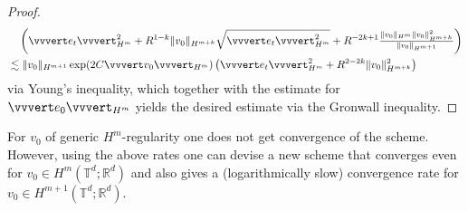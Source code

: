 \documentclass[a4paper, 12pt]{article}
\newcommand{\R}{\mathbb{R}}
\newcommand{\T}{\mathbb{T}}
\newcommand{\NHm}[1]{\vvvert#1\vvvert_{H^m}} %
\begin{document}
\begin{proof}
\begin{align*}
&\quad\left(\NHm{e_t}^2+R^{1-k}\|v_0\|_{H^{m+k}}\sqrt{\NHm{e_t}^2}+R^{-2k+1}\tfrac{\|v_0\|_{H^{m}}\|v_0\|_{H^{m+k}}^2}{\|v_0\|_{H^{m+1}}}\right)\\
&\lesssim\|v_0\|_{H^{m+1}}\exp(2C\NHm{v_0})\left(\NHm{e_t}^2+R^{2-2k}\|v_0\|_{H^{m+k}}^2\right)
\end{align*}
via Young's inequality,
which together with the estimate for $\NHm{e_0}$ yields the desired estimate via the Gronwall inequality.
\end{proof}

For $v_0$ of generic $H^m$-regularity one does not get convergence of the scheme.
However, using the above rates one can devise a new scheme that converges even for $v_0\in H^m(\T^d;\R^d)$ and also gives a (logarithmically slow) convergence rate for $v_0\in H^{m+1}(\T^d;\R^d)$.
\end{document}
